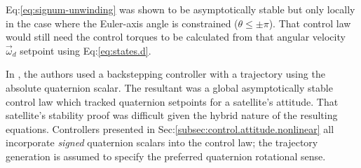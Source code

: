 Eq:\ref{eq:signum-unwinding} was shown to be asymptotically stable but only locally in the case where the Euler-axis angle is constrained ($\theta\leq \pm\pi$). That control law  would still need the control torques to be calculated from that angular velocity $\vec{\omega}_d$ setpoint using Eq:\ref{eq:states.d}.
\par
In \cite{intelligentbackstep}, the authors used a backstepping controller with a trajectory using the absolute quaternion scalar. The resultant was a global asymptotically stable control law which tracked quaternion setpoints for a satellite's attitude. That satellite's stability proof was  difficult given the hybrid nature of the resulting equations. Controllers presented in Sec:\ref{subsec:control.attitude.nonlinear} all incorporate \emph{signed} quaternion scalars into the control law; the trajectory generation is assumed to specify the preferred quaternion rotational sense.
\newpage

